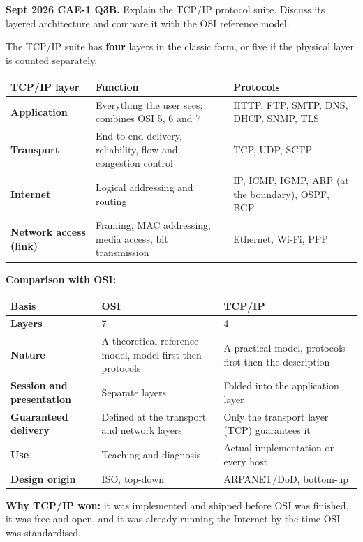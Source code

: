 \documentclass[11pt,a4paper]{article}
\begin{document}
\begin{pyqbox}
\textbf{Sept 2026 CAE-1 Q3B.} Explain the TCP/IP protocol suite. Discuss its layered architecture and compare it with the OSI reference model.
\end{pyqbox}

\begin{solbox}
The TCP/IP suite has \textbf{four} layers in the classic form, or five if the physical layer is counted separately.

\begin{center}\small
\begin{tabularx}{\textwidth}{>{\bfseries}p{} X p{}}
\toprule TCP/IP layer & Function & Protocols\\
\midrule
Application & Everything the user sees; combines OSI 5, 6 and 7 & HTTP, FTP, SMTP, DNS, DHCP, SNMP, TLS\\
Transport & End-to-end delivery, reliability, flow and congestion control & TCP, UDP, SCTP\\
Internet & Logical addressing and routing & IP, ICMP, IGMP, ARP (at the boundary), OSPF, BGP\\
Network access (link) & Framing, MAC addressing, media access, bit transmission & Ethernet, Wi-Fi, PPP\\
\bottomrule
\end{tabularx}
\end{center}

\textbf{Comparison with OSI:}

\begin{center}\small
\begin{tabularx}{\textwidth}{>{\bfseries}p{} X X}
\toprule Basis & OSI & TCP/IP\\
\midrule
Layers & 7 & 4\\
Nature & A theoretical reference model, model first then protocols & A practical model, protocols first then the description\\
Session and presentation & Separate layers & Folded into the application layer\\
Guaranteed delivery & Defined at the transport and network layers & Only the transport layer (TCP) guarantees it\\
Use & Teaching and diagnosis & Actual implementation on every host\\
Design origin & ISO, top-down & ARPANET/DoD, bottom-up\\
\bottomrule
\end{tabularx}
\end{center}

\textbf{Why TCP/IP won:} it was implemented and shipped before OSI was finished, it was free and open, and it was already running the Internet by the time OSI was standardised.
\end{solbox}
\end{document}
